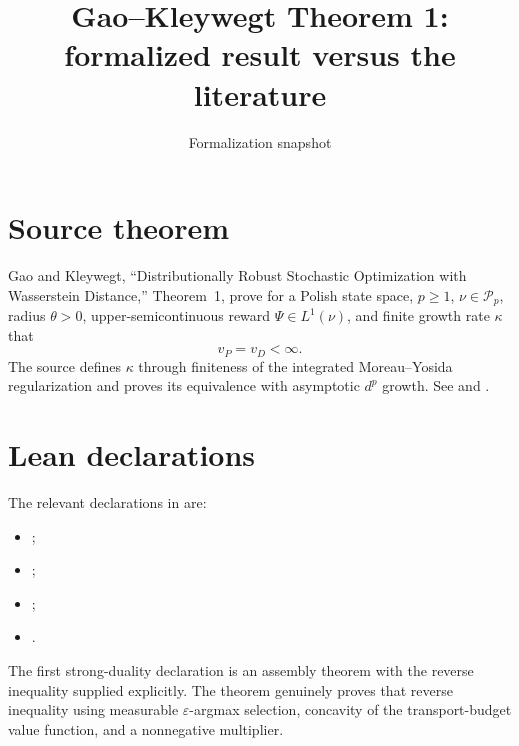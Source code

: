 \title{Gao--Kleywegt Theorem 1: formalized result versus the literature}
\author{}
\date{Formalization snapshot \snapshot}

\maketitle
{}
\section{Source theorem}
Gao and Kleywegt, ``Distributionally Robust Stochastic Optimization with Wasserstein Distance,'' Theorem~1, prove for a Polish state space, $p\ge1$, $\nu\in\mathcal P_p$, radius $\theta>0$, upper-semicontinuous reward $\Psi\in L^1(\nu)$, and finite growth rate $\kappa$ that
\[
 v_P=v_D<\infty.
\]
The source defines $\kappa$ through finiteness of the integrated Moreau--Yosida regularization and proves its equivalence with asymptotic $d^p$ growth.  See
 and
.

\section{Lean declarations}
The relevant declarations in  are:
\begin{itemize}[leftmargin=2em]
\item {};
\item {};
\item {};
\item {}.
\end{itemize}
The first strong-duality declaration is an assembly theorem with the reverse inequality supplied explicitly.  The  theorem genuinely proves that reverse inequality using measurable $\varepsilon$-argmax selection, concavity of the transport-budget value function, and a nonnegative multiplier.

